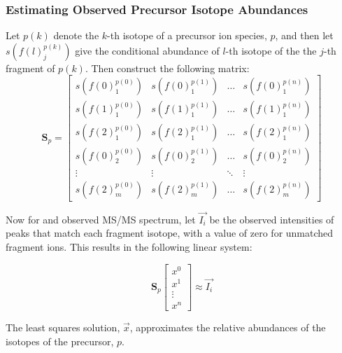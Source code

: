 \documentclass[pdflatex,sn-nature]{sn-jnl}
\begin{document}
\subsubsection{Estimating Observed Precursor Isotope Abundances}\label{subsubsec:estimating-precursor-isotope-abundances}
Let $p(k)$ denote the $k$-th isotope of a precursor ion species, $p$, and then let $s\left(f(l)_{j}^{p(k)}\right)$ give the conditional abundance of $l$-th isotope of the the $j$-th fragment of $p(k)$. Then construct the following matrix:
\begin{equation}
\mathbf{S}_{p} = \begin{bmatrix} 
s\left(f(0)_{1}^{p(0)}\right) & s\left(f(0)_{1}^{p(1)}\right) & \hdots & s\left(f(0)_{1}^{p(n)}\right) \\
s\left(f(1)_{1}^{p(0)}\right) & s\left(f(1)_{1}^{p(1)}\right) & \hdots & s\left(f(1)_{1}^{p(n)}\right) \\
s\left(f(2)_{1}^{p(0)}\right) & s\left(f(2)_{1}^{p(1)}\right) & \hdots & s\left(f(2)_{1}^{p(n)}\right) \\
s\left(f(0)_{2}^{p(0)}\right) & s\left(f(0)_{2}^{p(1)}\right) & \hdots & s\left(f(0)_{2}^{p(n)}\right) \\
\vdots & \vdots & \ddots & \vdots \\
s\left(f(2)_{m}^{p(0)}\right) & s\left(f(2)_{m}^{p(1)}\right) & \hdots & s\left(f(2)_{m}^{p(n)}\right)
\end{bmatrix}
\end{equation}

Now for and observed MS/MS spectrum, let $\vec{I_{i}}$ be the observed intensities of peaks that match each fragment isotope, with a value of zero for unmatched fragment ions. This results in the following linear system:

\begin{equation}
    \mathbf{S}_p \begin{bmatrix} 
    x^0 \\
    x^1 \\
    \vdots \\
    x^n
\end{bmatrix} \approx \vec{I_{i}}
\end{equation}

The least squares solution, $\vec{x}$, approximates the relative abundances of the isotopes of the precursor, $p$.


\end{document}
